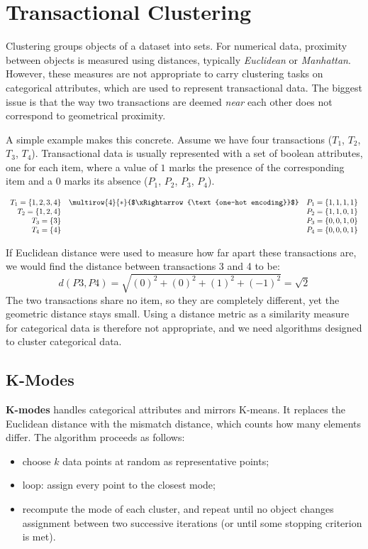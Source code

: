 \section{Transactional Clustering}

Clustering groups objects of a dataset into sets. For numerical data, proximity between objects is measured using distances, typically \textit{Euclidean} or \textit{Manhattan}. However, these measures are not appropriate to carry clustering tasks on categorical attributes, which are used to represent transactional data. The biggest issue is that the way two transactions are deemed \textit{near} each other does not correspond to geometrical proximity.

A simple example makes this concrete. Assume we have four transactions ($T_1$, $T_2$, $T_3$, $T_4$). Transactional data is usually represented with a set of boolean attributes, one for each item, where a value of $1$ marks the presence of the corresponding item and a $0$ marks its absence ($P_1$, $P_2$, $P_3$, $P_4$).

\[
\begin{array}{r c l}
T_1 = \{1,2,3,4\} & \multirow{4}{*}{$\xRightarrow{\text{one-hot encoding}}$} & P_1 = \{1,1,1,1\} \\
T_2 = \{1,2,4\}   &                                                         & P_2 = \{1,1,0,1\} \\
T_3 = \{3\}       &                                                         & P_3 = \{0,0,1,0\} \\
T_4 = \{4\}       &                                                         & P_4 = \{0,0,0,1\} \\
\end{array}
\]

If Euclidean distance were used to measure how far apart these transactions are, we would find the distance between transactions 3 and 4 to be:
\begin{equation*}
    d(P3, P4) = \sqrt{(0)^2 + (0)^2 + (1)^2 + (-1)^2} = \sqrt{2}    
\end{equation*}
The two transactions share no item, so they are completely different, yet the geometric distance stays small. Using a distance metric as a similarity measure for categorical data is therefore not appropriate, and we need algorithms designed to cluster categorical data.

\subsection{K-Modes}
\textbf{K-modes} handles categorical attributes and mirrors K-means. It replaces the Euclidean distance with the mismatch distance, which counts how many elements differ. The algorithm proceeds as follows:
\begin{itemize}
    \item choose $k$ data points at random as representative points;
    \item loop: assign every point to the closest mode;
    \item recompute the mode of each cluster, and repeat until no object changes assignment between two successive iterations (or until some stopping criterion is met).
\end{itemize}


